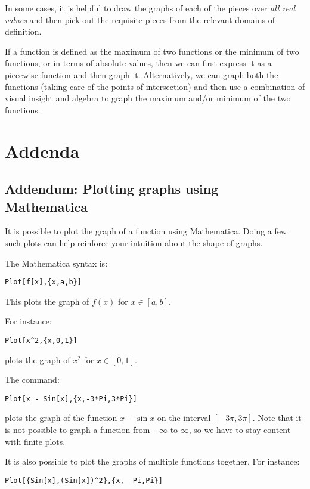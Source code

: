 \documentclass[10pt]{amsart}
\begin{document}
In some cases, it is helpful to draw the graphs of each of the pieces
over {\em all real values} and then pick out the requisite pieces from
the relevant domains of definition.

If a function is defined as the maximum of two functions or the
minimum of two functions, or in terms of absolute values, then we can
first express it as a piecewise function and then graph
it. Alternatively, we can graph both the functions (taking care of the
points of intersection) and then use a combination of visual insight
and algebra to graph the maximum and/or minimum of the two functions.

\section{Addenda}

\subsection{Addendum: Plotting graphs using Mathematica}

It is possible to plot the graph of a function using
Mathematica. Doing a few such plots can help reinforce your intuition
about the shape of graphs.

The Mathematica syntax is:

\begin{verbatim}
Plot[f[x],{x,a,b}]
\end{verbatim}

This plots the graph of $f(x)$ for $x \in [a,b]$.

For instance:

\begin{verbatim}
Plot[x^2,{x,0,1}]
\end{verbatim}

plots the graph of $x^2$ for $x \in [0,1]$.

The command:

\begin{verbatim}
Plot[x - Sin[x],{x,-3*Pi,3*Pi}]
\end{verbatim}

plots the graph of the function $x - \sin x$ on the interval
$[-3\pi,3\pi]$. Note that it is not possible to graph a function from
$-\infty$ to $\infty$, so we have to stay content with finite plots.

It is also possible to plot the graphs of multiple functions together. For instance:

\begin{verbatim}
Plot[{Sin[x],(Sin[x])^2},{x, -Pi,Pi}]
\end{verbatim}
\end{document}
